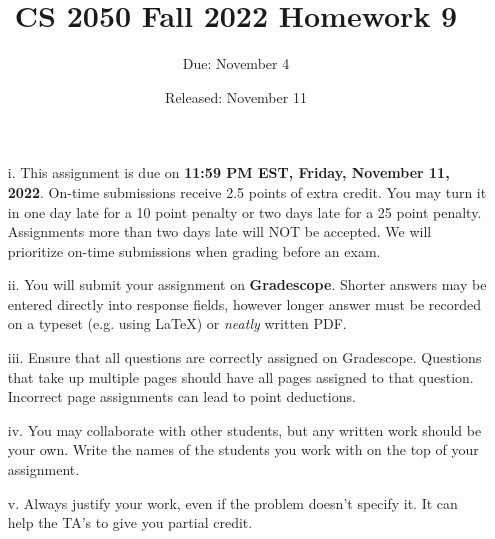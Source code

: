 \documentclass{article}
\title{CS 2050 Fall 2022 Homework 9}
\author{Due: November 4}
\date{Released: November 11}
\begin{document}
\maketitle

\begin{enumerate}
    \item[i.] This assignment is due on \textbf{11:59 PM EST, Friday, November 11, 2022}.  On-time submissions receive 2.5 points of extra credit. You may turn it in one day late for a 10 point penalty or two days late for a 25 point penalty. Assignments more than two days late will NOT be accepted.  We will prioritize on-time submissions when grading before an exam.
    \item[ii.] You will submit your assignment on \textbf{Gradescope}. Shorter answers may be entered directly into response fields, however longer answer must be recorded on a typeset (e.g. using \LaTeX) or \emph{neatly} written PDF.
    \item[iii.] Ensure that all questions are correctly assigned on Gradescope. Questions that take up multiple pages should have all pages assigned to that question. Incorrect page assignments can lead to point deductions.
    \item[iv.] You may collaborate with other students, but any written work should be your own. Write the names of the students you work with on the top of your assignment.
    \item[v.] Always justify your work, even if the problem doesn't specify it. It can help the TA's to give you partial credit.
\end{enumerate}
\end{document}
